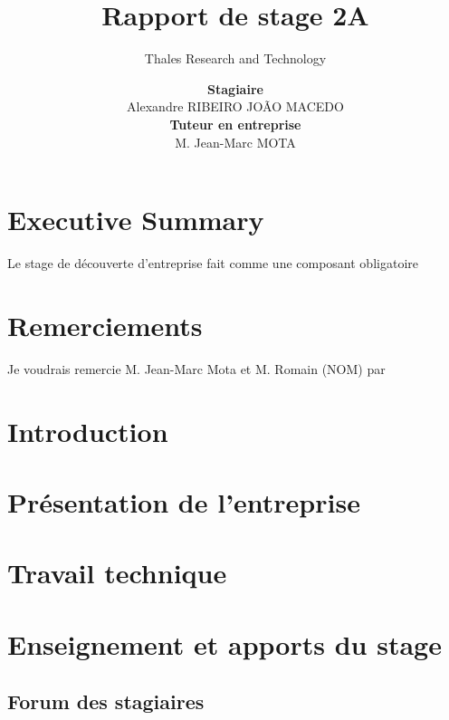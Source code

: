 \documentclass[a4paper, 10pt]{article} %
\begin{document}
\title{Rapport de stage 2A}
\subtitle{Thales Research and Technology}
\author{
\begin{tabular}{ccc}
	\textbf{Stagiaire}
	\\
	Alexandre RIBEIRO JOÃO MACEDO
	\\	
	\textbf{Tuteur en entreprise} 
	\\
	M. Jean-Marc MOTA
\end{tabular}
}

\maketitle

\section{Executive Summary}
Le stage de découverte d'entreprise fait comme une composant obligatoire  

\newpage
\section{Remerciements}
Je voudrais remercie M. Jean-Marc Mota et M. Romain (NOM) par 

\newpage
\tableofcontents

\newpage
\section{Introduction}

\newpage
\section{Présentation de l'entreprise}

\newpage
\section{Travail technique}

\newpage
\section{Enseignement et apports du stage}
\subsection{Forum des stagiaires}
\end{document}
